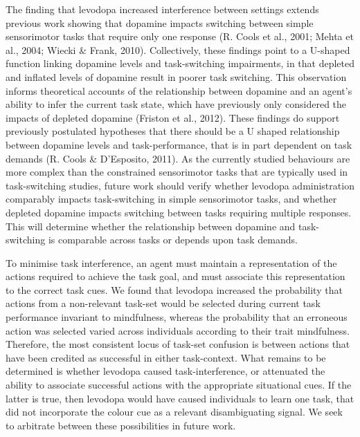 \documentclass[
  man]{apa6}
\begin{document}
The finding that levodopa increased interference between settings extends previous work showing that dopamine impacts switching between simple sensorimotor tasks that require only one response (R. Cools et al., 2001; Mehta et al., 2004; Wiecki \& Frank, 2010). Collectively, these findings point to a U-shaped function linking dopamine levels and task-switching impairments, in that depleted and inflated levels of dopamine result in poorer task switching. This observation informs theoretical accounts of the relationship between dopamine and an agent's ability to infer the current task state, which have previously only considered the impacts of depleted dopamine (Friston et al., 2012). These findings do support previously postulated hypotheses that there should be a U shaped relationship between dopamine levels and task-performance, that is in part dependent on task demands (R. Cools \& D'Esposito, 2011). As the currently studied behaviours are more complex than the constrained sensorimotor tasks that are typically used in task-switching studies, future work should verify whether levodopa administration comparably impacts task-switching in simple sensorimotor tasks, and whether depleted dopamine impacts switching between tasks requiring multiple responses. This will determine whether the relationship between dopamine and task-switching is comparable across tasks or depends upon task demands.

To minimise task interference, an agent must maintain a representation of the actions required to achieve the task goal, and must associate this representation to the correct task cues. We found that levodopa increased the probability that actions from a non-relevant task-set would be selected during current task performance invariant to mindfulness, whereas the probability that an erroneous action was selected varied across individuals according to their trait mindfulness. Therefore, the most consistent locus of task-set confusion is between actions that have been credited as successful in either task-context. What remains to be determined is whether levodopa caused task-interference, or attenuated the ability to associate successful actions with the appropriate situational cues. If the latter is true, then levodopa would have caused individuals to learn one task, that did not incorporate the colour cue as a relevant disambiguating signal. We seek to arbitrate between these possibilities in future work.
\end{document}
